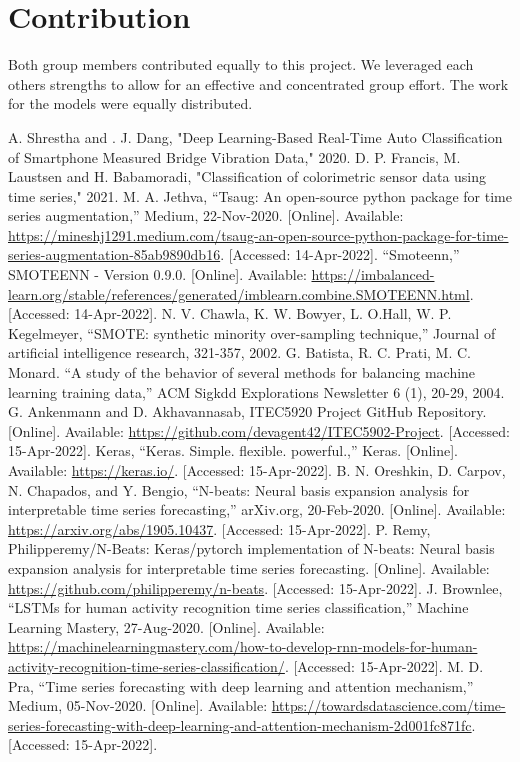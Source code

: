 \documentclass[conference]{IEEEtran}
\begin{document}
\section{Contribution}
Both group members contributed equally to this project. We leveraged each others strengths to allow for an effective and concentrated group effort. The work for the models were equally distributed.
\begin{thebibliography}{00}
 A. Shrestha and . J. Dang, "Deep Learning-Based Real-Time Auto Classification of Smartphone Measured Bridge Vibration Data," 2020. 
 D. P. Francis, M. Laustsen and H. Babamoradi, "Classification of colorimetric sensor data using time series," 2021.
 M. A. Jethva, “Tsaug: An open-source python package for time series augmentation,” Medium, 22-Nov-2020. [Online]. Available: \url{https://mineshj1291.medium.com/tsaug-an-open-source-python-package-for-time-series-augmentation-85ab9890db16}. [Accessed: 14-Apr-2022]. 
 “Smoteenn,” SMOTEENN - Version 0.9.0. [Online]. Available: \url{https://imbalanced-learn.org/stable/references/generated/imblearn.combine.SMOTEENN.html}. [Accessed: 14-Apr-2022].
 N. V. Chawla, K. W. Bowyer, L. O.Hall, W. P. Kegelmeyer, “SMOTE: synthetic minority over-sampling technique,” Journal of artificial intelligence research, 321-357, 2002. 
 G. Batista, R. C. Prati, M. C. Monard. “A study of the behavior of several methods for balancing machine learning training data,” ACM Sigkdd Explorations Newsletter 6 (1), 20-29, 2004.
 G. Ankenmann and D. Akhavannasab, ITEC5920 Project GitHub Repository. [Online]. Available: \url{https://github.com/devagent42/ITEC5902-Project}. [Accessed: 15-Apr-2022]. 
 Keras, “Keras. Simple. flexible. powerful.,” Keras. [Online]. Available: \url{https://keras.io/}. [Accessed: 15-Apr-2022].
 B. N. Oreshkin, D. Carpov, N. Chapados, and Y. Bengio, “N-beats: Neural basis expansion analysis for interpretable time series forecasting,” arXiv.org, 20-Feb-2020. [Online]. Available: \url{https://arxiv.org/abs/1905.10437}. [Accessed: 15-Apr-2022]. 
 P. Remy, Philipperemy/N-Beats: Keras/pytorch implementation of N-beats: Neural basis expansion analysis for interpretable time series forecasting. [Online]. Available: \url{https://github.com/philipperemy/n-beats}. [Accessed: 15-Apr-2022]. 
 J. Brownlee, “LSTMs for human activity recognition time series classification,” Machine Learning Mastery, 27-Aug-2020. [Online]. Available: \url{https://machinelearningmastery.com/how-to-develop-rnn-models-for-human-activity-recognition-time-series-classification/}. [Accessed: 15-Apr-2022]. 
 M. D. Pra, “Time series forecasting with deep learning and attention mechanism,” Medium, 05-Nov-2020. [Online]. Available: \url{https://towardsdatascience.com/time-series-forecasting-with-deep-learning-and-attention-mechanism-2d001fc871fc}. [Accessed: 15-Apr-2022]. 


\end{thebibliography}
\end{document}
